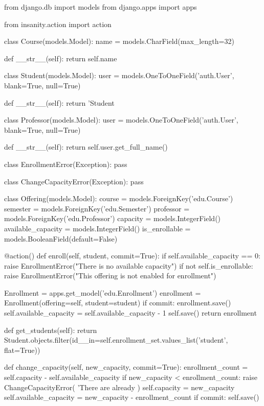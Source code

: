 
\begin{simplecode}
from django.db import models
from django.apps import apps

from insanity.action import action


class Course(models.Model):
    name = models.CharField(max_length=32)

    def __str__(self):
        return self.name


class Student(models.Model):
    user = models.OneToOneField('auth.User', blank=True, null=True)

    def __str__(self):
        return 'Student%


class Professor(models.Model):
    user = models.OneToOneField('auth.User', blank=True, null=True)

    def __str__(self):
        return self.user.get_full_name()


class EnrollmentError(Exception):
    pass


class ChangeCapacityError(Exception):
    pass


class Offering(models.Model):
    course = models.ForeignKey('edu.Course')
    semester = models.ForeignKey('edu.Semester')
    professor = models.ForeignKey('edu.Professor')
    capacity = models.IntegerField()
    available_capacity = models.IntegerField()
    is_enrollable = models.BooleanField(default=False)

    @action()
    def enroll(self, student, commit=True):
        if self.available_capacity == 0:
            raise EnrollmentError("There is no available capacity")
        if not self.is_enrollable:
            raise EnrollmentError("This offering is not enabled for enrollment")

        Enrollment = apps.get_model('edu.Enrollment')
        enrollment = Enrollment(offering=self, student=student)
        if commit:
            enrollment.save()
            self.available_capacity = self.available_capacity - 1
            self.save()
        return enrollment

    def get_students(self):
        return Student.objects.filter(id__in=self.enrollment_set.values_list('student', flat=True))

    def change_capacity(self, new_capacity, commit=True):
        enrollment_count = self.capacity - self.available_capacity
        if new_capacity < enrollment_count:
            raise ChangeCapacityError(
                'There are already %
            )
        self.capacity = new_capacity
        self.available_capacity = new_capacity - enrollment_count
        if commit:
            self.save()



\end{simplecode}
